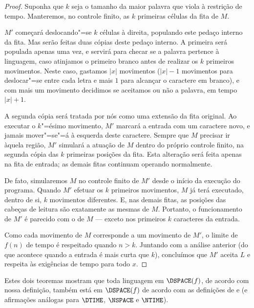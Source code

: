 \begin{proof}
    Suponha que $k$ seja o tamanho da maior palavra
    que viola à restrição de tempo.
    Manteremos, no controle finito,
    as $k$ primeiras células da fita de $M$.

    $M'$ começará deslocando"=se $k$ células à direita,
    populando este pedaço interno da fita.
    Mas serão feitas duas cópias deste pedaço interno.
    A primeira será populada apenas uma vez,
    e servirá para checar se a palavra
    pertence à linguagem,
    caso atinjamos o primeiro branco
    antes de realizar os $k$ primeiros movimentos.
    Neste caso, gastamos $|x|$ movimentos
    ($|x| - 1$ movimentos para deslocar"=se entre cada letra
    e mais $1$ para alcançar o caractere em branco),
    e com mais um movimento
    decidimos se aceitamos ou não a palavra,
    em tempo $|x| + 1$.

    A segunda cópia será tratada por nós
    como uma extensão da fita original.
    Ao executar o $k$"=ésimo movimento,
    $M'$ marcará a entrada com um caractere novo,
    e jamais mover"=se"=á à esquerda deste caractere.
    Sempre que $M$ precisar ir àquela região,
    $M'$ simulará a atuação de $M$
    dentro do próprio controle finito,
    na segunda cópia das $k$ primeiras posições da fita.
    Esta alteração será feita apenas na fita de entrada;
    as demais fitas continuam operando normalmente.

    De fato, simularemos $M$ no controle finito de $M'$
    desde o início da execução do programa.
    Quando $M'$ efetuar os $k$ primeiros movimentos,
    $M$ já terá executado, dentro de si,
    $k$ movimentos diferentes.
    E, nas demais fitas, as posições das cabeças de leitura
    são exatamente as mesmas de $M$.
    Portanto,
    o funcionamento de $M'$
    é parecido com o de $M$
    --- exceto nos primeiros $k$ caracteres da entrada.

    Como cada movimento de $M$ corresponde a um movimento de $M'$,
    o limite de $f(n)$ de tempo é respeitado
    quando $n > k$.
    Juntando com a análise anterior
    (do que acontece quando a entrada é mais curta que $k$),
    concluímos que $M'$ aceita $L$ e respeita às exigências de tempo
    para todo $x$.
\end{proof}

Estes dois teoremas mostram que
toda linguagem em $\DSPACE(f)$,
de acordo com nossa definição,
também está em $\DSPACE(f)$
de acordo com as definições de 
e 
(e afirmações análogas para $\DTIME$, $\NSPACE$ e $\NTIME$).


